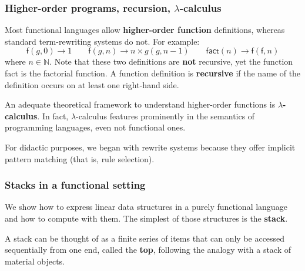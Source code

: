 \documentclass[compress,dvipdfmx]{beamer}
\newcommand\fun[1]{\textsf{#1}}
\begin{document}
\begin{frame}
  \frametitle{Higher-order programs, recursion, $\lambda$-calculus}

  Most functional languages allow \textbf{higher\hyp{}order function}
  definitions, whereas standard term\hyp{}rewriting systems do
  not. For example:
  \begin{equation*}
    \fun{f}(g,0) \rightarrow 1
    \qquad
    \fun{f}(g,n) \rightarrow n \times g(g,n-1)
    \qquad
    \fun{fact}(n) \rightarrow \fun{f}(\fun{f},n)
  \end{equation*}
  where \(n \in \mathbb{N}\). Note that these two definitions are
  \textbf{not} recursive, yet the function \fun{fact} is the factorial
  function. A function definition is \textbf{recursive} if the name of
  the definition occurs on at least one right\hyp{}hand side.

  \bigskip

  An adequate theoretical framework to understand higher\hyp{}order
  functions is \textbf{\(\lambda\)-calculus}. In fact,
  \(\lambda\)-calculus features prominently in the semantics of
  programming languages, even not functional ones.

  \bigskip

  For didactic purposes, we began with rewrite systems because they
  offer implicit pattern matching (that is, rule selection).

\end{frame}


\begin{frame}
  \frametitle{Stacks in a functional setting}

  We show how to express linear data structures in a purely functional
  language and how to compute with them. The simplest of those
  structures is the \textbf{stack}.

  \bigskip

  A stack can be thought of as a finite series of items that can only
  be accessed sequentially from one end, called the \textbf{top},
  following the analogy with a stack of material objects.

\end{frame}
\end{document}
